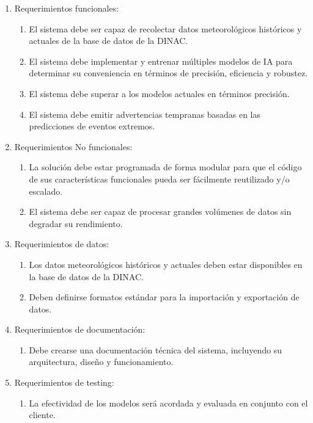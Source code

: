 \documentclass[
11pt, %
codirector, %
]{charter}
\begin{document}
\begin{enumerate}
	\item Requerimientos funcionales:
		\begin{enumerate}
			\item El sistema debe ser capaz de recolectar datos meteorológicos históricos y actuales de la base de datos de la DINAC.
			\item El sistema debe implementar y entrenar múltiples modelos de IA para determinar su conveniencia en términos de precisión, eficiencia y robustez.
			\item El sistema debe superar a los modelos actuales en términos precisión.
			\item El sistema debe emitir advertencias tempranas basadas en las predicciones de eventos extremos.
		\end{enumerate}
	\item Requerimientos No funcionales:
		\begin {enumerate}
			\item La solución debe estar programada de forma modular para que el código de sus características funcionales pueda ser fácilmente reutilizado y/o escalado.
			\item El sistema debe ser capaz de procesar grandes volúmenes de datos sin degradar su rendimiento.
		\end{enumerate}
	\item Requerimientos de datos:
		\begin {enumerate}
			\item Los datos meteorológicos históricos y actuales deben estar disponibles en la base de datos de la DINAC.
			\item Deben definirse formatos estándar para la importación y exportación de datos.
		\end{enumerate}
	\item Requerimientos de documentación:
		\begin{enumerate}
			\item Debe crearse una documentación técnica del sistema, incluyendo su arquitectura, diseño y funcionamiento.
		\end{enumerate}
	\item Requerimientos de testing:
		\begin{enumerate}
			\item La efectividad de los modelos será acordada y evaluada en conjunto con el cliente.
		\end{enumerate}
\end{enumerate}
\end{document}

